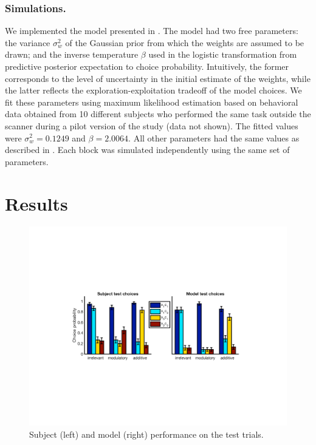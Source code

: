 \documentclass[10pt,letterpaper]{article}
\begin{document}
\subsubsection{Simulations.} 

We implemented the model presented in . The model had two free parameters: the variance $\sigma^2_w$ of the Gaussian prior from which the weights are assumed to be drawn; and the inverse temperature $\beta$ used in the logistic transformation from predictive posterior expectation to choice probability. Intuitively, the former corresponds to the level of uncertainty in the initial estimate of the weights, while the latter reflects the exploration-exploitation tradeoff of the model choices. We fit these parameters using maximum likelihood  estimation based on behavioral data obtained from 10 different subjects who performed the same task outside the scanner during a pilot version of the study (data not shown). The fitted values were $\sigma^2_w = 0.1249$ and $\beta = 2.0064$. All other parameters had the same values as described in . Each block was simulated independently using the same set of parameters.


\section{Results}

\begin{figure}[ht]
\begin{center}
\includegraphics[scale=0.45,  trim = 120 220 120 200]{behavioral.pdf}
\end{center}
\caption{Subject (left) and model (right) performance on the test trials.} 
\label{behavioral}
\end{figure}
\end{document}
